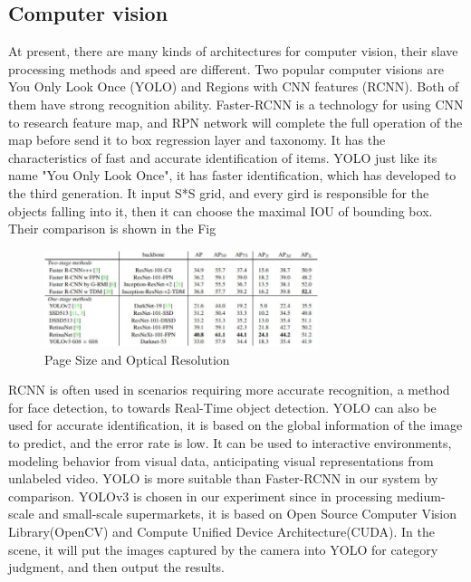 \subsection{Computer vision}
At present, there are many kinds of architectures for computer vision, their slave processing methods and speed are different.
Two popular computer visions are You Only Look Once (YOLO) and Regions with CNN features (RCNN)\cite{NIPS2015_5638}\cite{yolov3}.
Both of them have strong recognition ability. Faster-RCNN is a technology for using CNN to research feature map, and RPN network will complete the full operation of the map before send it to box regression layer and taxonomy\cite{NIPS2015_5638}.
It has the characteristics of fast and accurate identification of items.
YOLO just like its name "You Only Look Once", it has faster identification, which has developed to the third generation.
It input S*S grid, and every gird is responsible for the objects falling into it, then it can choose the maximal IOU of bounding box\cite{yolov3}.
Their comparison is shown in the Fig

\begin{figure}[htbp]
\centerline{\includegraphics[width=8cm,scale=0.9]{YOLO-FRCNN.jpg}}
\caption{Page Size and Optical Resolution}
\label{fig}
\end{figure}

RCNN is often used in scenarios requiring more accurate recognition, a method for face detection\cite{7961803}\cite{Li_2015_CVPR}\cite{Yang_2016_CVPR}, to towards Real-Time object detection\cite{NIPS2015_5638}\cite{10.1007/978-3-319-10602-1_26}.
YOLO can also be used for accurate identification, it is based on the global information of the image to predict, and the error rate is low.
It can be used to interactive environments\cite{Gordon_2018_CVPR}, modeling behavior from visual data\cite{Ehsani_2018_CVPR}, anticipating visual representations from unlabeled video\cite{Vondrick_2016_CVPR}.
YOLO is more suitable than Faster-RCNN in our system by comparison.
YOLOv3 is chosen in our experiment since in processing medium-scale and small-scale supermarkets, it is based on Open Source Computer Vision Library(OpenCV) and Compute Unified Device Architecture(CUDA).
In the scene, it will put the images captured by the camera into YOLO for category judgment, and then output the results.


